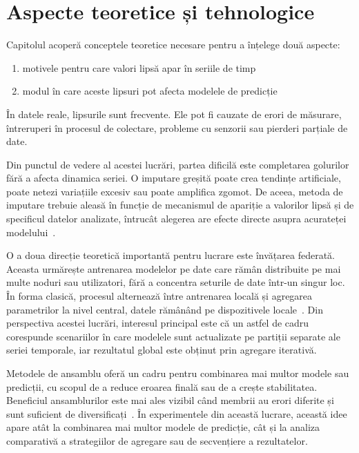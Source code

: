 \chapter{Aspecte teoretice și tehnologice}

Capitolul acoperă conceptele teoretice necesare pentru a înțelege două aspecte:
\begin{enumerate}
    \item motivele pentru care valori lipsă apar în seriile de timp
    \item  modul în care aceste lipsuri pot afecta modelele de predicție
\end{enumerate}
În datele reale, lipsurile sunt frecvente. Ele pot fi cauzate de erori de măsurare, întreruperi în procesul de colectare, probleme cu senzorii sau pierderi parțiale de date.

Din punctul de vedere al acestei lucrări, partea dificilă este completarea golurilor fără a afecta dinamica seriei. O imputare greșită poate crea tendințe artificiale, poate netezi variațiile excesiv sau poate amplifica zgomot. De aceea, metoda de imputare trebuie aleasă în funcție de mecanismul de apariție a valorilor lipsă și de specificul datelor analizate, întrucât alegerea are efecte directe asupra acurateței modelului~\cite{acock2005missing, rubin1976inference, little2002missing}.

O a doua direcție teoretică importantă pentru lucrare este învățarea federată. Aceasta urmărește antrenarea modelelor pe date care rămân distribuite pe mai multe noduri sau utilizatori, fără a concentra seturile de date într-un singur loc. În forma clasică, procesul alternează între antrenarea locală și agregarea parametrilor la nivel central, datele rămânând pe dispozitivele locale~\cite{mcmahan2017fedavg, kairouz2021fl}. Din perspectiva acestei lucrări, interesul principal este că un astfel de cadru corespunde scenariilor în care modelele sunt actualizate pe partiții separate ale seriei temporale, iar rezultatul global este obținut prin agregare iterativă.

Metodele de ansamblu oferă un cadru pentru combinarea mai multor modele sau predicții, cu scopul de a reduce eroarea finală sau de a crește stabilitatea. Beneficiul ansamblurilor este mai ales vizibil când membrii au erori diferite și sunt suficient de diversificați~\cite{dietterich2000ensemble, zhou2012ensemble}. În experimentele din această lucrare, această idee apare atât la combinarea mai multor modele de predicție, cât și la analiza comparativă a strategiilor de agregare sau de secvențiere a rezultatelor.

